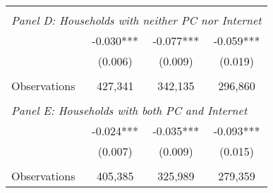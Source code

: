 {\begin{tabular}{lccc}
&  &  &   \\
\multicolumn{4}{l}{\textit{Panel D: Households with neither PC nor Internet}} \\
\hspace{3mm}        &      -0.030***&      -0.077***&      -0.059***\\
                    &     (0.006)   &     (0.009)   &     (0.019)   \\
                    &               &               &               \\
\hspace{3mm}Observations&     427,341   &     342,135   &     296,860   \\
 
&  &  &   \\
\multicolumn{4}{l}{\textit{Panel E: Households with both PC and Internet}} \\
\hspace{3mm}        &      -0.024***&      -0.035***&      -0.093***\\
                    &     (0.007)   &     (0.009)   &     (0.015)   \\
                    &               &               &               \\
\hspace{3mm}Observations&     405,385   &     325,989   &     279,359   \\
 

\bottomrule
\end{tabular}
}
